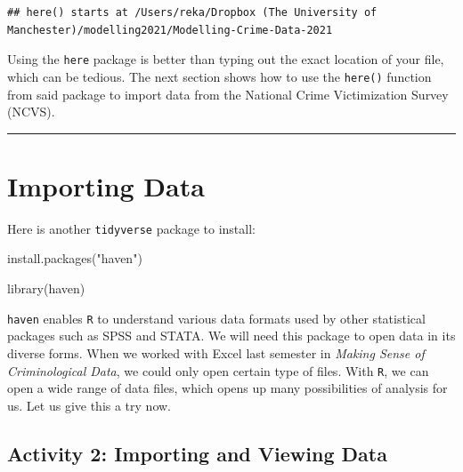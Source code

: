 \documentclass[
]{book}
\newenvironment{Shaded}{\begin{snugshade}}{\end{snugshade}}
\newcommand{\FunctionTok}[1]{\textcolor[rgb]{0.00,0.00,0.00}{#1}}
\newcommand{\NormalTok}[1]{#1}
\newcommand{\StringTok}[1]{\textcolor[rgb]{0.31,0.60,0.02}{#1}}
\begin{document}
\begin{verbatim}
## here() starts at /Users/reka/Dropbox (The University of Manchester)/modelling2021/Modelling-Crime-Data-2021
\end{verbatim}

Using the \texttt{here} package is better than typing out the exact location of your file, which can be tedious. The next section shows how to use the \texttt{here()} function from said package to import data from the National Crime Victimization Survey (NCVS).

\begin{center}\rule{0.5\linewidth}{0.5pt}\end{center}

\hypertarget{importing-data}{%
\section{Importing Data}\label{importing-data}}

Here is another \texttt{tidyverse} package to install:

\begin{Shaded}
\begin{Highlighting}[]
\FunctionTok{install.packages}\NormalTok{(}\StringTok{"haven"}\NormalTok{)}
\end{Highlighting}
\end{Shaded}

\begin{Shaded}
\begin{Highlighting}[]
\FunctionTok{library}\NormalTok{(haven)}
\end{Highlighting}
\end{Shaded}

\texttt{haven} enables \texttt{R} to understand various data formats used by other statistical packages such as SPSS and STATA. We will need this package to open data in its diverse forms. When we worked with Excel last semester in \emph{Making Sense of Criminological Data}, we could only open certain type of files. With \texttt{R}, we can open a wide range of data files, which opens up many possibilities of analysis for us. Let us give this a try now.

\hypertarget{activity-2-importing-and-viewing-data}{%
\subsection{Activity 2: Importing and Viewing Data}\label{activity-2-importing-and-viewing-data}}
\end{document}
